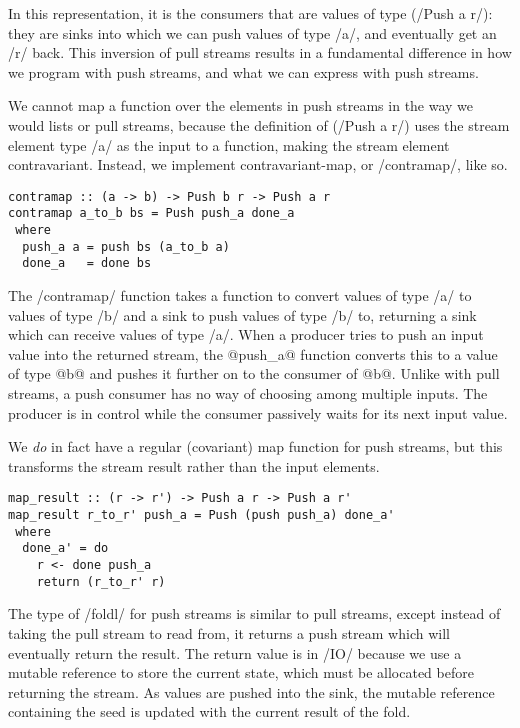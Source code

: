 In this representation, it is the consumers that are values of type (\Hs/Push a r/): they are sinks into which we can push values of type \Hs/a/, and eventually get an \Hs/r/ back.
This inversion of pull streams results in a fundamental difference in how we program with push streams, and what we can express with push streams.

We cannot map a function over the elements in push streams in the way we would lists or pull streams, because the definition of (\Hs/Push a r/) uses the stream element type \Hs/a/ as the input to a function, making the stream element contravariant.
Instead, we implement contravariant-map, or \Hs/contramap/, like so.

\begin{lstlisting}
contramap :: (a -> b) -> Push b r -> Push a r
contramap a_to_b bs = Push push_a done_a
 where
  push_a a = push bs (a_to_b a)
  done_a   = done bs
\end{lstlisting}

The \Hs/contramap/ function takes a function to convert values of type \Hs/a/ to values of type \Hs/b/ and a sink to push values of type \Hs/b/ to, returning a sink which can receive values of type \Hs/a/.
When a producer tries to push an input value into the returned stream, the @push_a@ function converts this to a value of type @b@ and pushes it further on to the consumer of @b@.
Unlike with pull streams, a push consumer has no way of choosing among multiple inputs.
The producer is in control while the consumer passively waits for its next input value.

We \emph{do} in fact have a regular (covariant) map function for push streams, but this transforms the stream result rather than the input elements.

\begin{lstlisting}
map_result :: (r -> r') -> Push a r -> Push a r'
map_result r_to_r' push_a = Push (push push_a) done_a'
 where
  done_a' = do
    r <- done push_a
    return (r_to_r' r)
\end{lstlisting}

The type of \Hs/foldl/ for push streams is similar to pull streams, except instead of taking the pull stream to read from, it returns a push stream which will eventually return the result.
The return value is in \Hs/IO/ because we use a mutable reference to store the current state, which must be allocated before returning the stream.
As values are pushed into the sink, the mutable reference containing the seed is updated with the current result of the fold.

